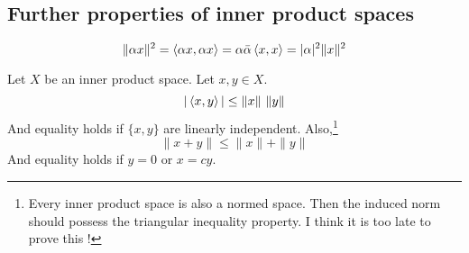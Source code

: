 \subsection{Further properties of inner product spaces}
\begin{remark}
	\[ \|\alpha x \|^2 = \left\langle \alpha x,\alpha x \right\rangle = \alpha \bar{\alpha} \left\langle x,x \right\rangle = |\alpha|^2 \|x\|^2 \]
\end{remark}

\begin{lemma}
	Let $X$ be an inner product space.
	Let $x,y \in X$.
	\[ |\left\langle x,y \right\rangle| \le \|x\| \ \|y\| \]
	And equality holds if $\{x,y\}$ are linearly independent.
	Also,\dag\footnote{Every inner product space is also a normed space. Then the induced norm should possess the triangular inequality property. I think it is too late to prove this !}
	\[ \|x+y\| \le \|x\| + \|y\| \]
	And equality holds if $y = 0$ or $x = cy$.
\end{lemma}
